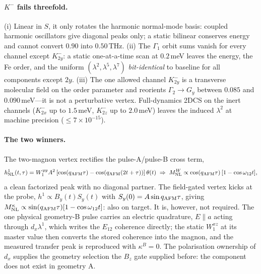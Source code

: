 \documentclass[11pt]{article}
\newcommand{\qafm}{q_{\rm AFM}}
\newcommand{\Mnl}{M_{\rm NL}}
\begin{document}
\paragraph{$K^-$ fails threefold.}
(i) Linear in $S$, it only rotates the harmonic normal-mode basis:
coupled harmonic oscillators give diagonal peaks only; a static bilinear
conserves energy and cannot convert $0.90$ into $0.50$\,THz.
(ii) The $\Gamma_1$ orbit sums vanish for every channel except
$K^-_{2y}$: a static one-at-a-time scan at $0.2$\,meV leaves the energy,
the Fe order, and the uniform $(\lambda^2,\lambda^5,\lambda^7)$
\emph{bit-identical} to baseline for all components except $2y$.
(iii) The one allowed channel $K^-_{2y}$ is a transverse molecular field
on the order parameter and reorients $\Gamma_2\to G_y$ between $0.085$
and $0.090$\,meV---it is not a perturbative vertex.  Full-dynamics 2DCS
on the inert channels ($K^-_{2x}$ up to $1.5$\,meV, $K^-_{2z}$ up to
$2.0$\,meV) leaves the induced $\lambda^2$ at machine precision
($\leq7\times10^{-15}$).

\paragraph{The two winners.}
The two-magnon vertex rectifies the pulse-A/pulse-B cross term,
\begin{equation}
  h^1_{\rm NL}(t,\tau)=W^{yy}_1A^2\left[\cos(\qafm\tau)
  -\cos(\qafm(2t+\tau))\right]\theta(t)
  \;\Rightarrow\;
  \Mnl^{W}\propto\cos(\qafm\tau)\,[1-\cos\omega_{12}t],
\end{equation}
a clean factorized peak with no diagonal partner.  The field-gated
vertex kicks at the probe, $h^1\propto B_y(t)S_y(t)$ with
$S_y(0)=A\sin\qafm\tau$, giving
$\Mnl^{\kappa}\propto\sin(\qafm\tau)[1-\cos\omega_{12}t]$: also on
target.  It is, however, not required.  The one physical geometry-B
pulse carries an electric quadrature, $E\!\parallel\!a$ acting through
$d_x\lambda^1$, which writes the $E_{12}$ coherence directly; the
static $W^{xz}_1$ at its master value then converts the stored
coherence into the magnon, and the measured transfer peak is
reproduced with $\kappa^B=0$.  The polarisation ownership of $d_x$
supplies the geometry selection the $B_z$ gate supplied before: the
component does not exist in geometry A.
\end{document}
